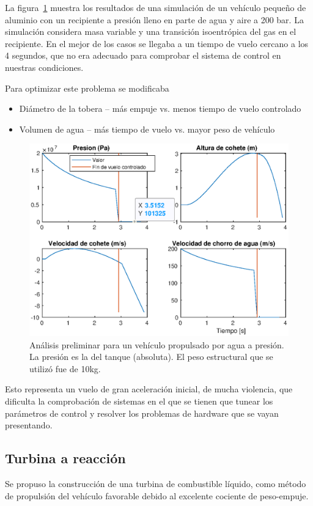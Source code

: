 \medskip

La figura~\ref{fig:bottlerocket} muestra los resultados de una simulación de un vehículo pequeño de aluminio con un recipiente a presión lleno en parte de agua y aire a 200 bar. La simulación considera masa variable y una transición isoentrópica del gas en el recipiente. En el mejor de los casos se llegaba a un tiempo de vuelo cercano a los 4 segundos, que no era adecuado para comprobar el sistema de control en nuestras condiciones. 

Para optimizar este problema se modificaba

\begin{itemize}
    \item Diámetro de la tobera -- más empuje vs. menos tiempo de vuelo controlado
    \item Volumen de agua -- más tiempo de vuelo vs. mayor peso de vehículo
\end{itemize}


\begin{figure}[!ht]
    \centering
    \includegraphics[width=0.8\linewidth]{fig/bottlerocket}
    \caption{Análisis preliminar para un vehículo propulsado por agua a presión. La presión es la del tanque (absoluta). El peso estructural que se utilizó fue de 10kg.}
    \label{fig:bottlerocket}
\end{figure}

Esto representa un vuelo de gran aceleración inicial, de mucha violencia, que dificulta la comprobación de sistemas en el que se tienen que tunear los parámetros de control y resolver los problemas de hardware que se vayan presentando. 

\subsection{Turbina a reacción}\label{ssec:turbina}
Se propuso la construcción de una turbina de combustible líquido, como método de propulsión
del vehículo favorable debido al excelente cociente de peso-empuje.

